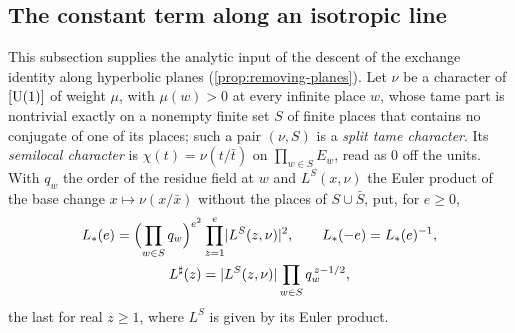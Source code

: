 \subsection{The constant term along an isotropic line}\label{ss:B-tower}
This subsection supplies the analytic input of the descent of the exchange identity along hyperbolic planes (\cref{prop:removing-planes}). Let $\nu$ be a character of
$[\operatorname{U}(1)]$ of weight $\mu$, with $\mu(w)>0$ at every infinite place $w$, whose tame part is nontrivial exactly on a nonempty finite set $S$ of finite places that contains no conjugate of one of its
places; such a pair $(\nu,S)$ is a \emph{split tame character}. Its \emph{semilocal character} is $\chi(t)=\nu(t/\bar t)$ on $\prod_{w\in S}E_w$, read as $0$ off the units. With $q_w$ the order of the residue
field at $w$ and $L^S(x,\nu)$ the Euler product of the base change $x\mapsto\nu(x/\bar x)$ without the places of $S\cup\bar S$, put, for $e\ge0$,
\begin{gather*}
  L_*(e)=\Bigl(\prod_{w\in S}q_w\Bigr)^{e^2}\prod_{z=1}^{e}\lvert L^S(z,\nu)\rvert^2,\qquad L_*(-e)=L_*(e)^{-1},\\
  L^\sharp(z)=\lvert L^S(z,\nu)\rvert\prod_{w\in S}q_w^{\,z-1/2},
\end{gather*}
the last for real $z\ge1$, where $L^S$ is given by its Euler product.


